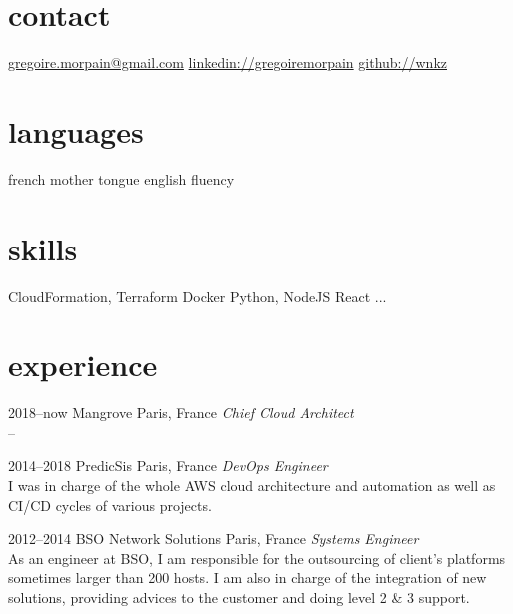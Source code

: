 \documentclass[]{cv-a4}
\begin{document}


\begin{aside} %
\section{contact}
\href{mailto:gregoire.morpain@gmail.com}{gregoire.morpain@gmail.com}
\href{https://www.linkedin.com/in/gregoiremorpain/en}{linkedin://gregoiremorpain}
\href{https://github.com/wnkz}{github://wnkz}
\section{languages}
french mother tongue
english fluency
\section{skills}
CloudFormation, Terraform
Docker
Python, NodeJS
React
...
\end{aside}


\section{experience}

\begin{entrylist}


\entry
{2018--now}
{Mangrove}
{Paris, France}
{\emph{Chief Cloud Architect} \\
--}

\entry
{2014--2018}
{PredicSis}
{Paris, France}
{\emph{DevOps Engineer} \\
I was in charge of the whole AWS cloud architecture and automation as well as CI/CD cycles of various projects.}

\entry
{2012--2014}
{BSO Network Solutions}
{Paris, France}
{\emph{Systems Engineer} \\
As an engineer at BSO, I am responsible for the outsourcing of client's platforms sometimes larger than 200 hosts. I am also in charge of the integration of new solutions, providing advices to the customer and doing level 2 \& 3 support.}


\end{entrylist}
\end{document}
